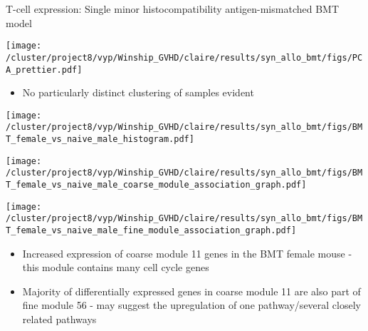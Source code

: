 \documentclass[final,hyperref={pdfpagelabels=false}]{beamer}
\begin{document}
\begin{frame}{}
\begin{columns}[t]
\begin{column}{.40\linewidth}
\begin{block}{T-cell expression: Single minor histocompatibility antigen-mismatched BMT model}
	  \begin{minipage}{0.25\textwidth}
	   \texttt{[image: /cluster/project8/vyp/Winship\_GVHD/claire/results/syn\_allo\_bmt/figs/PCA\_prettier.pdf]}
            \end{minipage}

   {\small          \begin{itemize}
          \item No particularly distinct clustering of samples evident
          \end{itemize}}

	  
          \begin{minipage}{0.30\textwidth}
            \texttt{[image: /cluster/project8/vyp/Winship\_GVHD/claire/results/syn\_allo\_bmt/figs/BMT\_female\_vs\_naive\_male\_histogram.pdf]}
          \end{minipage}
	  \hfill 
	\begin{minipage}{0.30\textwidth}
            \texttt{[image: /cluster/project8/vyp/Winship\_GVHD/claire/results/syn\_allo\_bmt/figs/BMT\_female\_vs\_naive\_male\_coarse\_module\_association\_graph.pdf]}
          \end{minipage}
	\hfill
	\begin{minipage}{0.30\textwidth}
            \texttt{[image: /cluster/project8/vyp/Winship\_GVHD/claire/results/syn\_allo\_bmt/figs/BMT\_female\_vs\_naive\_male\_fine\_module\_association\_graph.pdf]}
          \end{minipage}
	{\small \begin{itemize}
	\item Increased expression of coarse module 11 genes in the BMT female mouse - this module contains many cell cycle genes
	\item Majority of differentially expressed genes in coarse module 11 are also part of fine module 56 - may suggest the upregulation of one pathway/several closely related pathways 
	\end{itemize}}





\end{block}
\end{column}
\end{columns}
\end{frame}
\end{document}
